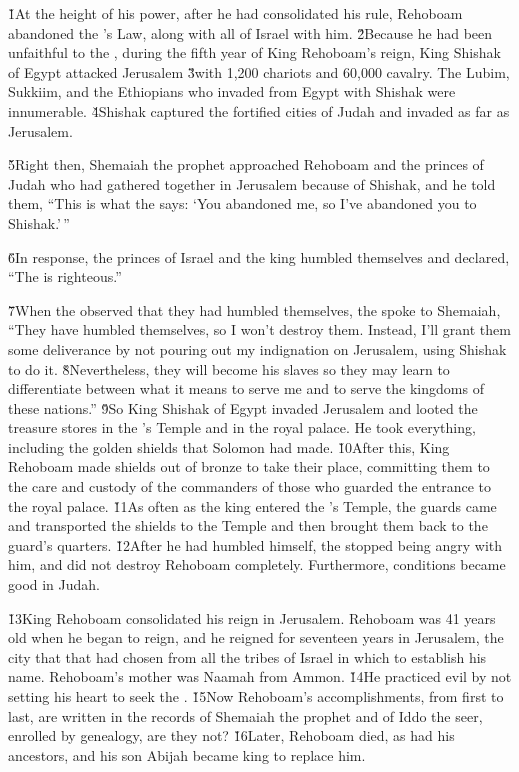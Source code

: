 \v{1}At the height of his power, after he had consolidated his rule, Rehoboam abandoned the 's Law, along with all of Israel with him. \v{2}Because he had been unfaithful to the , during the fifth year of King Rehoboam's reign, King Shishak of Egypt attacked Jerusalem \v{3}with 1,200 chariots and 60,000 cavalry. The Lubim, Sukkiim, and the Ethiopians who invaded from Egypt with Shishak were innumerable. \v{4}Shishak captured the fortified cities of Judah and invaded as far as Jerusalem.

\v{5}Right then, Shemaiah the prophet approached Rehoboam and the princes of Judah who had gathered together in Jerusalem because of Shishak, and he told them, ``This is what the  says: `You abandoned me, so I've abandoned you to Shishak.'\,''

\v{6}In response, the princes of Israel and the king humbled themselves and declared, ``The  is righteous.''

\v{7}When the  observed that they had humbled themselves, the  spoke to Shemaiah, ``They have humbled themselves, so I won't destroy them. Instead, I'll grant them some deliverance by not pouring out my indignation on Jerusalem, using Shishak to do it. \v{8}Nevertheless, they will become his slaves so they may learn to differentiate between what it means to serve me and to serve the kingdoms of these nations.'' \v{9}So King Shishak of Egypt invaded Jerusalem and looted the treasure stores in the 's Temple and in the royal palace. He took everything, including the golden shields that Solomon had made. \v{10}After this, King Rehoboam made shields out of bronze to take their place, committing them to the care and custody of the commanders of those who guarded the entrance to the royal palace. \v{11}As often as the king entered the 's Temple, the guards came and transported the shields to the Temple and then brought them back to the guard's quarters. \v{12}After he had humbled himself, the  stopped being angry with him, and did not destroy Rehoboam completely. Furthermore, conditions became good in Judah.

\v{13}King Rehoboam consolidated his reign in Jerusalem. Rehoboam was 41 years old when he began to reign, and he reigned for seventeen years in Jerusalem, the city that that  had chosen from all the tribes of Israel in which to establish his name. Rehoboam's mother was Naamah from Ammon. \v{14}He practiced evil by not setting his heart to seek the . \v{15}Now Rehoboam's accomplishments, from first to last, are written in the records of Shemaiah the prophet and of Iddo the seer, enrolled by genealogy, are they not? \v{16}Later, Rehoboam died, as had his ancestors, and his son Abijah became king to replace him.

